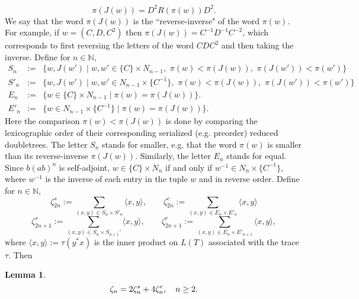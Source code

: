 \documentclass{amsart}
\newcommand{\N}{\mathbb N}
\newtheorem{lem}[thm]{Lemma}
\theoremstyle{definition}
\begin{document}
\begin{equation}\label{e:ri_EQ_D2_R_D2}
\pi(J(w))=D^2 R(\pi(w)) D^2.
\end{equation}
We say that the word $\pi(J(w))$ is the ``reverse-inverse" of the word
$\pi(w)$. For example, if $w=(C,D,C^2)$ then $\pi(J(w))=C^{-1}D^{-1}C^{-2}$, which corresponds to first reversing the letters of the word $CDC^2$ and then taking the inverse. 
%
Define for $n\in\N$,
\begin{eqnarray*}
S_n&:=&\{w, J(w')\mid w,w'\in \{C\}\times N_{n-1} ,\,\, \pi(w)<\pi(J(w)),\,\, \pi(J(w'))<\pi(w')\}\\
S'_n&:=&\{w, J(w')\mid w,w'\in N_{n-1}\times\{ C^{-1}\} ,\,\, \pi(w)<\pi(J(w)),\,\,\pi(J(w'))<\pi(w')\}\\
E_n&:=&\{ w\in \{C \}\times N_{n-1} \mid \pi(w)=\pi(J(w))\}.\\
E'_n&:=&\{ w\in N_{n-1}\times \{C^{-1}\} \mid \pi(w)=\pi(J(w))\}.
\end{eqnarray*}
Here the comparison $\pi(w)<\pi(J(w))$ is done by comparing the lexicographic order of their corresponding serialized (e.g. preorder) reduced doubletrees.
The letter $S_n$ stands for smaller, e.g. that the word $\pi(w)$ is smaller than its reverse-inverse $\pi(J(w))$.
Similarly, the letter $E_n$ stands for equal.
 Since $b(ab)^n$ is self-adjoint,  $w\in \{C\}\times N_n$ if and only if $w^{-1}\in N_n\times \{C^{-1}\}$, where $w^{-1}$ is the inverse of each entry in the tuple $w$ and in reverse order.
Define for $n\in\N$,
\begin{equation}\label{e:zeta_se_even}
\zeta_{2n}^{s}:=\sum_{(x,y)\in S_n\times S'_n} \langle x,y\rangle,\qquad \zeta_{2n}^{e}:=\sum_{(x,y)\in E_n\times E'_n} \langle x,y\rangle
\end{equation}
\begin{equation}\label{e:zeta_se_odd}
\zeta_{2n+1}^{s}:=\sum_{(x,y)\in S_{n}\times S_{n+1}'} \langle x,y\rangle,\qquad \zeta_{2n+1}^{e}:=\sum_{(x,y)\in E_{n}\times E'_{n+1}} \langle x,y\rangle,
\end{equation}
where $\langle x,y\rangle:=\tau(y^*x)$ is the inner product on $L(T)$ associated with the trace $\tau$. %
Then
\begin{lem}\label{l:zeta_se_zetarel}
$$
\zeta_{n}=2\zeta_{n}^s+4 \zeta_{n}^e,\quad n\ge2.\\
$$
\end{lem}
\end{document}
